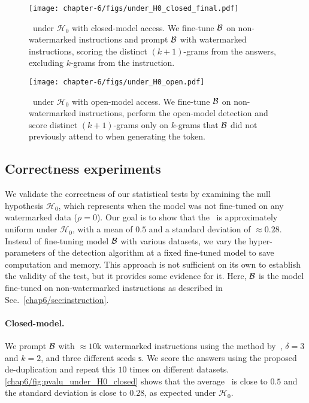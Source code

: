 \begin{figure}[b!]
    \begin{minipage}{0.48\textwidth}
        \centering
        \texttt{[image: chapter-6/figs/under\_H0\_closed\_final.pdf]}
        \caption{
            \pval\ under $\mathcal{H}_0$ with closed-model access.
            We fine-tune $\mathcal B$ on non-watermarked instructions and prompt $\mathcal B$ with watermarked instructions, scoring the distinct $(k+1)$-grams from the answers, excluding $k$-grams from the instruction. 
        }
        \label{chap6/fig:pvalu_under_H0_closed}
    \end{minipage} \hfill
    \begin{minipage}{0.48\textwidth}
        \centering
        \texttt{[image: chapter-6/figs/under\_H0\_open.pdf]}
        \caption{
            \pval\ under $\mathcal{H}_0$ with open-model access. 
            We fine-tune $\mathcal B$ on non-watermarked instructions, perform the open-model detection and score distinct $(k+1)$-grams only on $k$-grams that $\mathcal B$ did not previously attend to when generating the token. 
        }
        \label{chap6/fig:pvalu_under_H0}
    \end{minipage}
\end{figure}



\subsection{Correctness experiments}\label{chap6/app:correctness}

We validate the correctness of our statistical tests by examining the null hypothesis $\mathcal{H}_0$, which represents when the model was not fine-tuned on any watermarked data ($\rho=0$).
Our goal is to show that the \pval\ is approximately uniform under $\mathcal{H}_0$, with a mean of $0.5$ and a standard deviation of $\approx 0.28$.
Instead of fine-tuning model $\mathcal B$ with various datasets, we vary the hyper-parameters of the detection algorithm at a fixed fine-tuned model to save computation and memory. 
This approach is not sufficient on its own to establish the validity of the test, but it provides some evidence for it.
Here, $\mathcal B$ is the model fine-tuned on non-watermarked instructions as described in Sec.~\ref{chap6/sec:instruction}.


\paragraph{Closed-model.}
We prompt $\mathcal B$ with $\approx10$k watermarked instructions using the method by~\citet{kirchenbauer2023watermark}, $\delta=3$ and $k=2$, and three different seeds $\mathsf{s}$. 
We score the answers using the proposed de-duplication and repeat this $10$ times on different datasets. 
\autoref{chap6/fig:pvalu_under_H0_closed} shows that the average \pval\ is close to $0.5$ and the standard deviation is close to $0.28$, as expected under $\mathcal{H}_0$.


